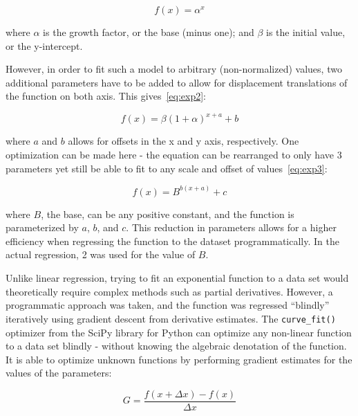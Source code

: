 \documentclass{mcmthesis}
\begin{document}
    \begin{equation}
        f(x) = \alpha^x
        \label{eq:exp}
    \end{equation}

    \noindent where $\alpha$ is the growth factor, or the base (minus one); and $\beta$ is the initial value, or the y-intercept.

    However, in order to fit such a model to arbitrary (non-normalized) values, two additional parameters have to be added to allow for displacement translations of the function on both axis. This gives~\eqref{eq:exp2}:

    \begin{equation}
        f(x) = \beta (1 + \alpha)^{x + a} + b
        \label{eq:exp2}
    \end{equation}

    \noindent where $a$ and $b$ allows for offsets in the x and y axis, respectively.
    One optimization can be made here - the equation can be rearranged to only have 3 parameters yet still be able to fit to any scale and offset of values~\eqref{eq:exp3}:

    \begin{equation}
        f(x) = B^{b (x + a)} + c
        \label{eq:exp3}
    \end{equation}

    \noindent where $B$, the base, can be any positive constant, and the function is parameterized by $a$, $b$, and $c$.
    This reduction in parameters allows for a higher efficiency when regressing the function to the dataset programmatically.
    In the actual regression, 2 was used for the value of $B$.

    Unlike linear regression, trying to fit an exponential function to a data set would theoretically require complex methods such as partial derivatives.
    However, a programmatic approach was taken, and the function was regressed ``blindly'' iteratively using gradient descent from derivative estimates.
    The \verb|curve_fit()| optimizer from the SciPy library for Python can optimize any non-linear function to a data set blindly - without knowing the algebraic denotation of the function.
    It is able to optimize unknown functions by performing gradient estimates for the values of the parameters:

    \begin{equation}
        G = \frac{f(x + \Delta x) - f(x)}{\Delta x}
    \end{equation}
\end{document}
